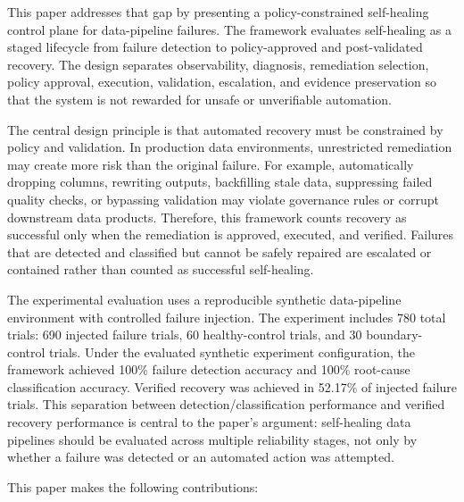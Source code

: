 This paper addresses that gap by presenting a policy-constrained self-healing control plane for data-pipeline failures. The framework evaluates self-healing as a staged lifecycle from failure detection to policy-approved and post-validated recovery. The design separates observability, diagnosis, remediation selection, policy approval, execution, validation, escalation, and evidence preservation so that the system is not rewarded for unsafe or unverifiable automation.

The central design principle is that automated recovery must be constrained by policy and validation. In production data environments, unrestricted remediation may create more risk than the original failure. For example, automatically dropping columns, rewriting outputs, backfilling stale data, suppressing failed quality checks, or bypassing validation may violate governance rules or corrupt downstream data products. Therefore, this framework counts recovery as successful only when the remediation is approved, executed, and verified. Failures that are detected and classified but cannot be safely repaired are escalated or contained rather than counted as successful self-healing.

The experimental evaluation uses a reproducible synthetic data-pipeline environment with controlled failure injection. The experiment includes 780 total trials: 690 injected failure trials, 60 healthy-control trials, and 30 boundary-control trials. Under the evaluated synthetic experiment configuration, the framework achieved 100\% failure detection accuracy and 100\% root-cause classification accuracy. Verified recovery was achieved in 52.17\% of injected failure trials. This separation between detection/classification performance and verified recovery performance is central to the paper's argument: self-healing data pipelines should be evaluated across multiple reliability stages, not only by whether a failure was detected or an automated action was attempted.

This paper makes the following contributions:

